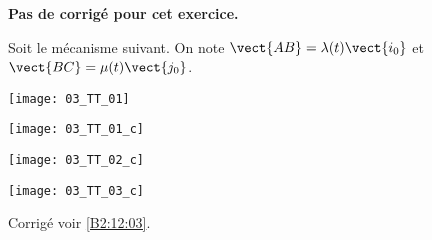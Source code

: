\normaltrue
\correctiontrue



\setcounter{numques}{0}
\ifcorrection
\else
\textbf{Pas de corrigé pour cet exercice.}
\fi

\ifprof
\else
Soit le mécanisme suivant. On note $\vect{AB}=\lambda(t)\vect{i_0}$ et $\vect{BC}=\mu(t)\vect{j_0}$.
\begin{center}
\texttt{[image: 03\_TT\_01]}
\end{center}
\fi

\ifprof
\begin{multicols}{3}
\else
\fi
{}
\ifprof
\begin{center}
\texttt{[image: 03\_TT\_01\_c]}
\end{center}
\else
\fi

\ifprof
\begin{center}
\texttt{[image: 03\_TT\_02\_c]}
\end{center}
\else
\fi

\ifprof
\begin{center}
\texttt{[image: 03\_TT\_03\_c]}
\end{center}
\else
\fi


\ifprof
\end{multicols}
\else
\fi

\ifprof
\else
\begin{flushright}
\footnotesize{Corrigé  voir \ref{B2:12:03}.}
\end{flushright}%
\fi


